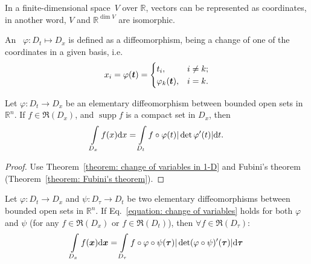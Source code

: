 \documentclass[openany]{book}
\DeclareMathOperator{\supp}{supp}
\begin{document}
In a finite-dimensional space~$V$ over $\mathbb R$, vectors can be represented as coordinates, in another word, $V$ and $\mathbb R^{\dim V}$ are isomorphic. 

\begin{definition}
	An ~$\varphi \colon D_t \mapsto D_x$ is defined as a diffeomorphism, being a change of one of the coordinates in a given basis, i.e.\ 
	\begin{equation*}
		x_i = \varphi(\boldsymbol{t}) = \begin{cases}
			t_i, & i \neq k;
			\\
			\varphi_k(\boldsymbol{t}), & i = k.
		\end{cases}
	\end{equation*}
\end{definition}

\begin{theorem}
	Let $\varphi \colon D_t \to D_x$ be an elementary diffeomorphism between bounded open sets in $\mathbb R^n$.
	If $f \in \mathfrak R(D_x)$, and $\supp f$ is a compact set in $D_x$, then
	\begin{equation*}
		\int\limits_{D_x} f(x) \mathrm{d} x = \int\limits_{D_t} f \circ \varphi(t) |\det \varphi'(t)|\mathrm{d} t.
	\end{equation*}
\end{theorem}
\begin{proof}
	Use Theorem~\ref{theorem: change of variables in 1-D} and Fubini's theorem (Theorem~\ref{theorem: Fubini's theorem}).
\end{proof}

\begin{theorem}
	Let $\varphi \colon D_t \to D_x$ and $\psi \colon D_\tau \to D_t$ be two elementary diffeomorphisms between bounded open sets in $\mathbb R^n$. 
	If Eq.~\ref{equation: change of variables} holds for both $\varphi$ and $\psi$ (for any $f \in \mathfrak R(D_x)$ or $f \in \mathfrak R(D_t)$), 
	then $\forall f \in \mathfrak R(D_\tau)$:
	\begin{equation*}
		\int\limits_{D_x} f(\boldsymbol{x}) \mathrm{d} \boldsymbol{x} = \int\limits_{D_{\tau}} f \circ \varphi \circ \psi(\boldsymbol{\tau}) |\det (\varphi \circ \psi)' (\boldsymbol{\tau})| \mathrm{d} \boldsymbol{\tau}
	\end{equation*}
\end{theorem}
\end{document}
